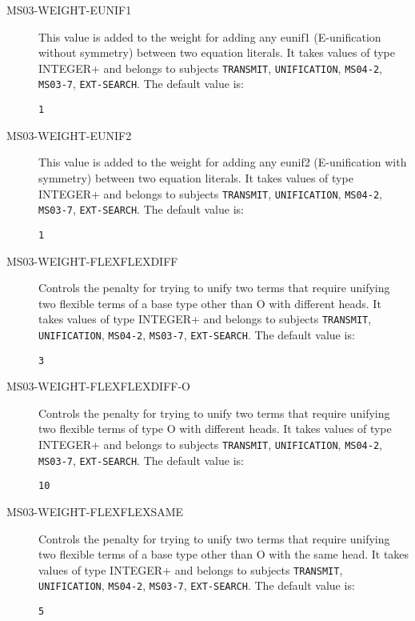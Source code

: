 \begin{description}
\item[MS03-WEIGHT-EUNIF1]  
This value is added to the weight for adding any eunif1
(E-unification without symmetry) between two equation literals.
It takes values of type INTEGER+ and belongs to subjects \texttt{TRANSMIT}, \texttt{UNIFICATION}, \texttt{MS04-2}, \texttt{MS03-7}, \texttt{EXT-SEARCH}.  The default value is: \begin{lstlisting}
1
\end{lstlisting}

\item[MS03-WEIGHT-EUNIF2]  
This value is added to the weight for adding any eunif2
(E-unification with symmetry) between two equation literals.
It takes values of type INTEGER+ and belongs to subjects \texttt{TRANSMIT}, \texttt{UNIFICATION}, \texttt{MS04-2}, \texttt{MS03-7}, \texttt{EXT-SEARCH}.  The default value is: \begin{lstlisting}
1
\end{lstlisting}

\item[MS03-WEIGHT-FLEXFLEXDIFF]  
Controls the penalty for trying to unify two terms that require
unifying two flexible terms of a base type other than O with different heads.
It takes values of type INTEGER+ and belongs to subjects \texttt{TRANSMIT}, \texttt{UNIFICATION}, \texttt{MS04-2}, \texttt{MS03-7}, \texttt{EXT-SEARCH}.  The default value is: \begin{lstlisting}
3
\end{lstlisting}

\item[MS03-WEIGHT-FLEXFLEXDIFF-O]  
Controls the penalty for trying to unify two terms that require
unifying two flexible terms of type O with different heads.
It takes values of type INTEGER+ and belongs to subjects \texttt{TRANSMIT}, \texttt{UNIFICATION}, \texttt{MS04-2}, \texttt{MS03-7}, \texttt{EXT-SEARCH}.  The default value is: \begin{lstlisting}
10
\end{lstlisting}

\item[MS03-WEIGHT-FLEXFLEXSAME]  
Controls the penalty for trying to unify two terms that require
unifying two flexible terms of a base type other than O with the same head.
It takes values of type INTEGER+ and belongs to subjects \texttt{TRANSMIT}, \texttt{UNIFICATION}, \texttt{MS04-2}, \texttt{MS03-7}, \texttt{EXT-SEARCH}.  The default value is: \begin{lstlisting}
5
\end{lstlisting}


\end{description}
